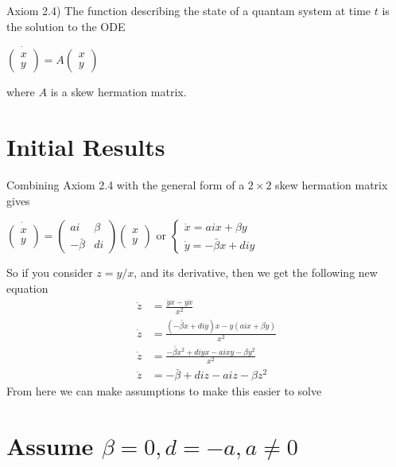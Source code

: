 \documentclass[10pt]{article}
\begin{document}
Axiom 2.4) The function describing the state of a quantam system at time $t$ is the solution to the ODE
\begin{center}$
\dot{\begin{pmatrix}x\\y\end{pmatrix}}=A\begin{pmatrix}x\\y\end{pmatrix}
$\end{center}
where $A$ is a skew hermation matrix.

\section{Initial Results}
Combining Axiom 2.4 with the general form of a $2\times2$ skew hermation matrix gives
\begin{center}
$\dot{\begin{pmatrix}x\\y\end{pmatrix}}=\begin{pmatrix}ai&\beta\\-\bar\beta&di\end{pmatrix}\begin{pmatrix}x\\y\end{pmatrix}$
or $\begin{cases}\dot x=aix+\beta y\\\dot y=-\bar\beta x+diy\end{cases}$
\end{center}
So if you consider $z=y/x$, and its derivative, then we get the following new equation
\begin{align*}
\dot z&=\frac{\dot yx-y\dot x}{x^2}\\
\dot z&=\frac{(-\bar\beta x+diy)x-y(aix+\beta y)}{x^2}\\
\dot z&=\frac{-\bar\beta x^2+diyx-aixy-\beta y^2}{x^2}\\
\dot z&=-\bar\beta+diz-aiz-\beta z^2
\end{align*}
From here we can make assumptions to make this easier to solve

\section{Assume $\beta=0, d=-a, a\neq0$}
\end{document}
